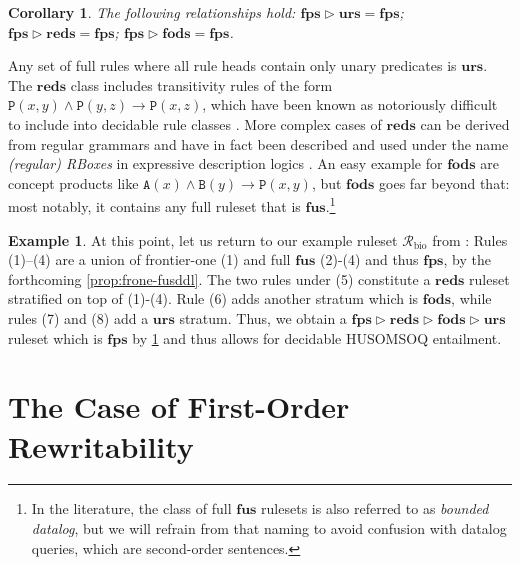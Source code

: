 \documentclass[10pt,a4paper]{amsart}
\theoremstyle{definition}
\newtheorem{exa}[exa]{Example}
\numberwithin{equation}{section}
\theoremstyle{plain}
\newtheorem{corollary}[corollary]{Corollary}
\theoremstyle{definition}
\newtheorem{example}[example]{Example}
\theoremstyle{myexample}
\renewenvironment{example}%
{
	\begin{shaded*}	
		\vspace{-1.5ex}
		\begin{exa}%
		}{
		\end{exa}
		\vspace{-1.5ex}
	\end{shaded*}
}
\theoremstyle{plain}
\theoremstyle{definition}
\newcommand{\cut}{\triangleright}
\newcommand{\ruleset}{\calr}
\newcommand{\fes}{\mathbf{fes}}
\newcommand{\fus}{\mathbf{fus}}
\newcommand{\fps}{\mathbf{fps}} %
\newcommand{\hcs}{\fps}
\newcommand{\fhcs}{\hcs}
\newcommand{\urs}{\mathbf{urs}}
\newcommand{\reds}{\mathbf{reds}}
\newcommand{\fods}{\mathbf{fods}}
\newcommand{\calr}{\mathcal{R}}
\newcommand{\pred}[1]{\mathtt{#1}}
\newcommand{\ppred}{\pred{P}}
\begin{document}
\begin{corollary}\label{prop:nicerelations}
The following relationships hold:
$\fhcs \cut \urs = \fhcs$;
$\fhcs \cut \reds = \fhcs$;
$\fhcs \cut \fods = \fhcs$. 
\end{corollary}


Any set of full rules where all rule heads contain only unary predicates is  $\urs$.
The $\reds$ class includes transitivity rules of the form $\ppred(x,y) \wedge \ppred(y,z) \to \ppred(x,z)$, which have been known as notoriously difficult to include into decidable rule classes \cite{BagetBMR15,GanzingerMV99,KieronskiR21,SzwastT04}.
More complex cases of $\reds$ can be derived from regular grammars and have in fact been described and used under the name \emph{(regular) RBoxes} in expressive description logics \cite{SROIQ}.
An easy example for $\fods$ are concept products \cite{BourhisMP17,RudolphKH08} like $\pred{A}(x) \wedge \pred{B}(y) \to \ppred(x,y)$, but $\fods$ goes far beyond that: most notably, it contains any full ruleset that is $\fus$.\footnote{In the literature, the class of full $\fus$ rulesets is also referred to as \emph{bounded datalog}, but we will refrain from that naming to avoid confusion with datalog queries, which are second-order sentences.} 


\begin{example}\label{ex:Rbio-good}
At this point, let us return to our example ruleset $\ruleset_\mathrm{bio}$ from : Rules (1)–(4) are a union of frontier-one (1) and full $\fus$ (2)-(4) and thus $\hcs$, by the forthcoming \cref{prop:frone-fusddl}. The two rules under (5) constitute a $\reds$ ruleset stratified on top of (1)-(4). Rule (6) adds another stratum which is $\fods$, while rules (7) and (8) add a $\urs$ stratum. Thus, we obtain a $\hcs \cut \reds \cut \fods \cut \urs$ ruleset which is $\hcs$ by \cref{prop:nicerelations} and thus allows for decidable HUSOMSOQ entailment.  
\end{example}

\section{The Case of First-Order Rewritability}\label{sec:FO-rewritability}
\end{document}
